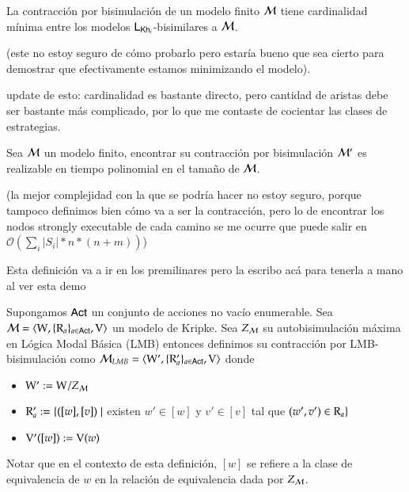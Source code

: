 \begin{teorema}
    La contracción por bisimulación de un modelo finito $\mathcal{M}$ tiene cardinalidad mínima entre los modelos $\mathsf{L}_{\mathsf{Kh}_i}$-bisimilares a $\mathcal{M}$.
\end{teorema}
(este no estoy seguro de cómo probarlo pero estaría bueno que sea cierto para demostrar que efectivamente estamos minimizando el modelo).

update de esto: cardinalidad es bastante directo, pero cantidad de aristas debe ser bastante más complicado, por lo que me contaste de cocientar las clases de estrategias.

\begin{teorema}
    Sea $\mathcal{M}$ un modelo finito, encontrar su contracción por bisimulación $\mathcal{M}'$ es realizable en tiempo polinomial en el tamaño de $\mathcal{M}$.
\end{teorema}

(la mejor complejidad con la que se podría hacer no estoy seguro, porque tampoco definimos bien cómo va a ser la contracción, pero lo de encontrar los nodos strongly executable de cada camino se me ocurre que puede salir en $\mathcal{O}(\sum_{i} |S_i|*n*(n+m))$)


Esta definición va a ir en los premilinares pero la escribo acá para tenerla a mano al ver esta demo
\begin{definicion}
    Supongamos ${\rm \sf Act}$ un conjunto de acciones no vacío enumerable.
    Sea $\mathcal{M} = \langle \mathrm{W},\{\mathrm{R}_a\}_{a\in{\rm \sf Act}},\mathrm{V} \rangle$ un modelo de Kripke. Sea $Z_{\mathcal{M}}$ su autobisimulación máxima en Lógica Modal Básica (LMB) entonces definimos su contracción por LMB-bisimulación como $\mathcal{M}_{LMB} = \langle \mathrm{W}',\{\mathrm{R}'_a\}_{a\in{\rm \sf Act}},\mathrm{V} \rangle$ donde
    \begin{center}
        \begin{itemize}
            \item $\mathrm{W}' := \mathrm{W} /Z_{\mathcal{M}}$
            \item $\mathrm{R}_a' := \{([w],[v]) \mid$ existen $w' \in [w]$ y $v' \in [v]$ tal que $(w',v') \in \mathrm{R}_a \}$
            \item $\mathrm{V}'([w]) := \mathrm{V}(w)$
        \end{itemize}
    \end{center}
    
    
\end{definicion}

Notar que en el contexto de esta definición, $[w]$ se refiere a la clase de equivalencia de $w$ en la relación de equivalencia dada por $Z_{\mathcal{M}}$. 



